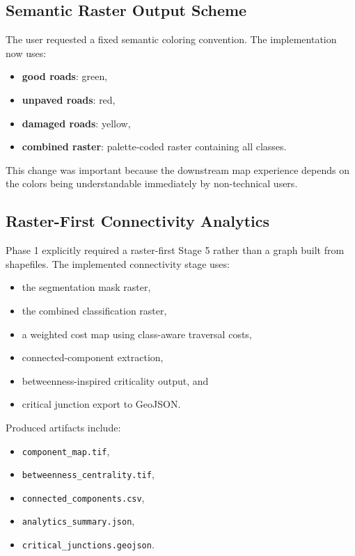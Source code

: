 \documentclass[conference]{IEEEtran}
\begin{document}
\subsection{Semantic Raster Output Scheme}
The user requested a fixed semantic coloring convention. The implementation now
uses:

\begin{itemize}[leftmargin=16pt]
\item \textbf{good roads}: green,
\item \textbf{unpaved roads}: red,
\item \textbf{damaged roads}: yellow,
\item \textbf{combined raster}: palette-coded raster containing all classes.
\end{itemize}

This change was important because the downstream map experience depends on the
colors being understandable immediately by non-technical users.

\subsection{Raster-First Connectivity Analytics}
Phase 1 explicitly required a raster-first Stage 5 rather than a graph built
from shapefiles. The implemented connectivity stage uses:

\begin{itemize}[leftmargin=16pt]
\item the segmentation mask raster,
\item the combined classification raster,
\item a weighted cost map using class-aware traversal costs,
\item connected-component extraction,
\item betweenness-inspired criticality output, and
\item critical junction export to GeoJSON.
\end{itemize}

Produced artifacts include:

\begin{itemize}[leftmargin=16pt]
\item \texttt{component\_map.tif},
\item \texttt{betweenness\_centrality.tif},
\item \texttt{connected\_components.csv},
\item \texttt{analytics\_summary.json},
\item \texttt{critical\_junctions.geojson}.
\end{itemize}
\end{document}
